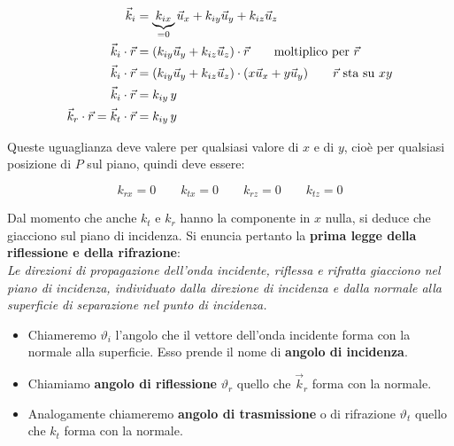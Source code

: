 \begin{figure}[htpb]
\end{figure}
\FloatBarrier

\begin{align*}
	\vec{k}_i &= \underbrace{k_{ix}}_{=0} \vec{u}_x + k_{iy} \vec{u}_y + k_{iz} \vec{u}_z \\
	\vec{k}_i\cdot \vec{r}  &= (k_{iy} \vec{u}_y + k_{iz} \vec{u}_z)\cdot \vec{r} \tag*{moltiplico per $\vec{r}$}\\
	\vec{k}_i\cdot \vec{r}  &= (k_{iy} \vec{u}_y + k_{iz} \vec{u}_z)\cdot (x\vec{u}_x+y\vec{u}_y) \tag*{$\vec{r}$ sta su $xy$}\\
	\vec{k}_i\cdot \vec{r}  &= k_{iy} \,y \\
	\vec{k}_r\cdot \vec{r} = \vec{k}_t\cdot \vec{r}  &= k_{iy} \,y
\end{align*}

Queste uguaglianza deve valere per qualsiasi valore di $x$ e di $y$, cioè per qualsiasi posizione di $P$ sul piano, quindi deve essere:

\[
	k_{rx} = 0 \qquad k_{tx} = 0 \qquad k_{rz} = 0 \qquad k_{tz} = 0
\]

Dal momento che anche $k_t$ e $k_r$ hanno la componente in $x$ nulla, si deduce che giacciono sul piano di incidenza. Si enuncia pertanto la \textbf{prima legge della riflessione e della rifrazione}:\\
\emph{Le direzioni di propagazione dell'onda incidente, riflessa e rifratta giacciono nel piano di incidenza, individuato dalla direzione di incidenza e dalla normale alla superficie di separazione nel punto di incidenza.}

\begin{itemize}
	\item Chiameremo $\vartheta_i$ l'angolo che il vettore dell'onda incidente forma con la normale alla superficie. Esso prende il nome di \textbf{angolo di incidenza}.
	\item Chiamiamo \textbf{angolo di riflessione} $\vartheta_r$ quello che $\vec{k}_r$ forma con la normale.
	\item Analogamente chiameremo \textbf{angolo di trasmissione} o di rifrazione $\vartheta_t$ quello che $k_t$ forma con la normale.
\end{itemize}

